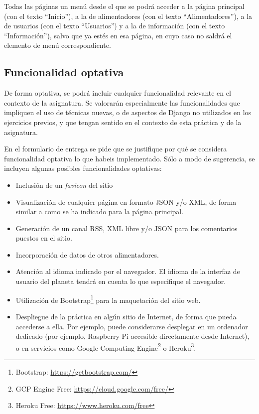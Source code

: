 Todas las páginas un menú desde el que se podrá acceder a la página principal (con el texto ``Inicio''), a la de alimentadores (con el texto ``Alimentadores''), a la de usuarios (con el texto ``Usuarios'') y a la de información (con el texto ``Información''), salvo que ya estés en esa página, en cuyo caso no saldrá el elemento de menú correspondiente.


\subsection{Funcionalidad optativa}

De forma optativa, se podrá incluir cualquier funcionalidad relevante en el contexto de la asignatura. Se valorarán especialmente las funcionalidades que impliquen el uso de técnicas nuevas, o de aspectos de Django no utilizados en los ejercicios previos, y que tengan sentido en el contexto de esta práctica y de la asignatura.

En el formulario de entrega se pide que se justifique por qué se considera funcionalidad optativa lo que habeis implementado. Sólo a modo de sugerencia, se incluyen algunas posibles funcionalidades optativas:

\begin{itemize}
  \item Inclusión de un \emph{favicon} del sitio
  
  \item Visualización de cualquier página en formato JSON y/o XML, de forma similar a como se ha indicado para la página principal.

  \item Generación de un canal RSS, XML libre y/o JSON para los comentarios puestos en el sitio.

  \item Incorporación de datos de otros alimentadores.
 
  \item Atención al idioma indicado por el navegador. El idioma de la interfaz de usuario del planeta tendrá en cuenta lo que especifique el navegador.

  \item Utilización de Bootstrap\footnote{Bootstrap: \url{https://getbootstrap.com/}} para la maquetación del sitio web.
    
  \item Despliegue de la práctica en algún sitio de Internet, de forma que pueda accederse a ella. Por ejemplo, puede considerarse desplegar en un ordenador dedicado (por ejemplo, Raspberry Pi accesible directamente desde Internet), o en servicios como Google Computing Engine\footnote{GCP Engine Free: \url{https://cloud.google.com/free/}} o Heroku\footnote{Heroku Free: \url{https://www.heroku.com/free}}.
\end{itemize}

